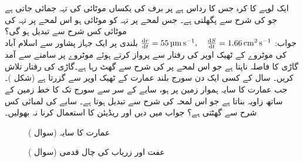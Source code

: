 \quad
ایک لوہے کا کرہ جس کا رداس  ہے پر برف کی یکساں موٹائی کی تہہ جمائی جاتی ہے جو  کی شرح سے پگھلتی ہے۔ جس لمحے پر  تہہ کو موٹائی  ہو اس لمحے پر تہہ کی موٹائی کس شرح سے تبدیل ہو گی؟\\
جواب:\quad
$\tfrac{\dif r}{\dif t}=\SI{55}{\micro\meter\per\second}, \quad \tfrac{\dif S}{\dif t}=\SI{1.66}{\centi\meter\squared\per\second}$
\quad
{} بلندی پر ایک جہاز پشاور سے اسلام آباد کی موٹروے کے ٹھیک اوپر  کی رفتار سے پرواز کرتے ہوئے موٹروے پر  سامنے سے آمد گاڑی کا فاصلہ  ناپتا ہے جو اس لمحے پر  کی شرح سے گھٹ رہا ہے۔گاڑی کی رفتار تلاش کریں۔
\quad
سال کے کسی ایک دن سورج  بلند عمارت کے ٹھیک اوپر سے گزرتا ہے (شکل )۔ جب عمارت کا سایہ ہموار زمین پر  ہو، سایے کے سر سے سورج تک کا خط زمین کے ساتھ زاویہ  بناتا ہے جو اس لمحہ  کی شرح سے تبدیل ہوتا ہے۔ سایے کی لمبائی کس شرح سے گھٹتی ہے؟ جواب  میں دیں اور ریڈیئن کا استعمال کرنا نہ بھولیں۔
\begin{figure}
\centering
\begin{minipage}{0.45\textwidth}
\centering
{}
\caption{عمارت کا سایہ (سوال )}
\label{شکل_سوال_تفرق_عمارت_سایہ}
\end{minipage}\hfill
\begin{minipage}{0.45\textwidth}
\centering
{}
\caption{عفت اور زریاب کی چال قدمی (سوال )}
\label{شکل_سوال_تفرق_عفت_زریاب}
\end{minipage}
\end{figure}
